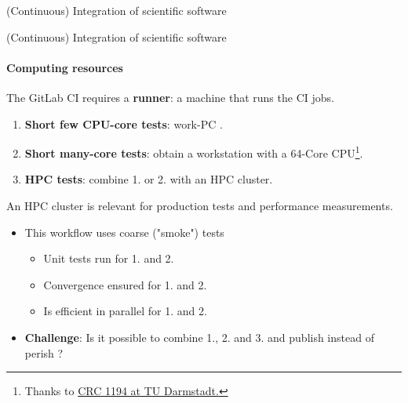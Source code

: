 \begin{frame}{(Continuous) Integration of scientific software}
\end{frame}

\begin{frame}{(Continuous) Integration of scientific software} 
\framesubtitle{Computing resources}
\vfill

    \vfill
    The GitLab CI requires a \textbf{runner}: a machine that runs the CI jobs.
    \begin{enumerate}
        \item \textbf{Short few CPU-core tests}: work-PC \faGraduationCap.    
        \item \textbf{Short many-core tests}: obtain a workstation with a 64-Core CPU\footnote{Thanks to \href{https://www.sfb1194.tu-darmstadt.de/index.en.jsp}{CRC 1194 at TU Darmstadt.}}\faGraduationCap.
        \item \textbf{HPC tests}: combine 1. or 2. with an HPC cluster. 
    \end{enumerate}

    An HPC cluster is relevant for production tests and performance measurements.
    \begin{itemize}
        \item This workflow uses coarse ("smoke") tests \faGraduationCap
            \begin{itemize}
                \item Unit tests run for 1. and 2.
                \item Convergence ensured for 1. and 2.
                \item Is efficient in parallel for 1. and 2. 
            \end{itemize}
        \item \textbf{Challenge}: Is it possible to combine 1., 2. and 3. and publish instead of perish \faGraduationCap?
    \end{itemize}

\end{frame}

